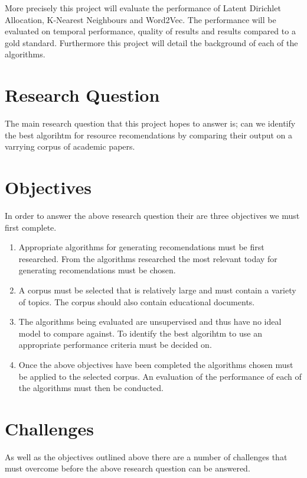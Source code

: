 More precisely this project will evaluate the performance of Latent Dirichlet Allocation, K-Nearest Neighbours and Word2Vec.
The performance will be evaluated on temporal performance, quality of results and results compared to a gold standard.
Furthermore this project will detail the background of each of the algorithms.

\section{Research Question}
The main research question that this project hopes to answer is; can we identify the best algorihtm for resource recomendations by comparing their output on a varrying corpus of academic papers.

\section{Objectives}
In order to answer the above research question their are three objectives we must first complete.

\begin{enumerate}
    \item Appropriate algorithms for generating recomendations must be first researched.
    From the algorithms researched the most relevant today for generating recomendations must be chosen.

    \item A corpus must be selected that is relatively large and must contain a variety of topics.
    The corpus should also contain educational documents.

    \item The algorithms being evaluated are unsupervised and thus have no ideal model to compare against.
    To identify the best algorihtm to use an appropriate performance criteria must be decided on.

    \item Once the above objectives have been completed the algorithms chosen must be applied to the selected corpus.
    An evaluation of the performance of each of the algorithms must then be conducted.
\end{enumerate}

\section{Challenges}
As well as the objectives outlined above there are a number of challenges that must overcome before the above research question can be answered.


